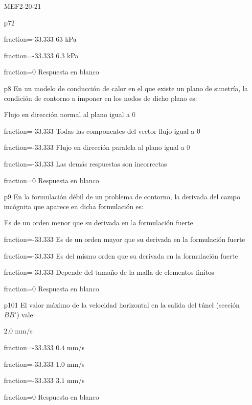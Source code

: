 \documentclass[a4paper]{article}
\begin{document}
\begin{quiz}{MEF2-20-21}
\begin{multi}{p72}
	\item[fraction=-33.333] $63$ kPa
	\item[fraction=-33.333] $6.3$ kPa
	\item[fraction=0] Respuesta en blanco
\end{multi}
\begin{multi}{p8}
	En un modelo de conducci\'on de calor en el que existe un plano de simetr\'ia, la
	condici\'on de contorno a imponer en los nodos de dicho plano es:
	\item* Flujo en direcci\'on normal al plano igual a $0$
	\item[fraction=-33.333] Todas las componentes del vector flujo igual a $0$
	\item[fraction=-33.333] Flujo en direcci\'on paralela al plano igual a $0$
	\item[fraction=-33.333] Las dem\'as respuestas son incorrectas
	\item[fraction=0] Respuesta en blanco
\end{multi}
\begin{multi}{p9}
	En la formulaci\'on d\'ebil de un problema de contorno, la derivada del
campo inc\'ognita que aparece en dicha formulaci\'on es:
	\item* Es de un orden menor que su derivada en la formulaci\'on fuerte
	\item[fraction=-33.333] Es de un orden mayor que su derivada en la formulaci\'on fuerte
	\item[fraction=-33.333] Es del mismo orden que su derivada en la formulaci\'on fuerte
	\item[fraction=-33.333] Depende del tama\~{n}o de la malla de elementos finitos
	\item[fraction=0] Respuesta en blanco
\end{multi}
\begin{multi}{p101}
	El valor m\'aximo de la velocidad horizontal en la salida del t\'unel (secci\'on $BB'$) vale:
	\item* $2.0$ mm/s
	\item[fraction=-33.333] $0.4$ mm/s
	\item[fraction=-33.333] $1.0$ mm/s
	\item[fraction=-33.333] $3.1$ mm/s
	\item[fraction=0] Respuesta en blanco

\end{multi}
\end{quiz}
\end{document}
